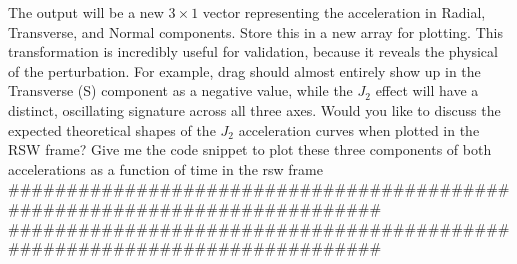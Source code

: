  The output will be a new $3 \times 1$ vector representing the acceleration in Radial, Transverse, and Normal components. Store this in a new array for plotting.\markdownRendererOlItemEnd 
\markdownRendererOlEnd \markdownRendererInterblockSeparator
{}This transformation is incredibly useful for validation, because it reveals the physical  of the perturbation. For example, drag should almost entirely show up in the Transverse (S) component as a negative value, while the $J_2$ effect will have a distinct, oscillating signature across all three axes.\markdownRendererInterblockSeparator
{}Would you like to discuss the expected theoretical shapes of the $J_2$ acceleration curves when plotted in the RSW frame?\markdownRendererInterblockSeparator
{}\markdownRendererThematicBreak{}\markdownRendererInterblockSeparator
{}
\markdownRendererSectionEnd 
\markdownRendererSectionEnd \markdownRendererSectionBegin
{}\markdownRendererInterblockSeparator
{}Give me the code snippet to plot these three components of both accelerations as a function of time in the rsw frame\markdownRendererInterblockSeparator
{}###########################################################################\markdownRendererInterblockSeparator
{}
\markdownRendererSectionEnd 
\markdownRendererSectionEnd \markdownRendererSectionBegin
{}\markdownRendererInterblockSeparator
{}###########################################################################\markdownRendererInterblockSeparator
{}
\markdownRendererSectionEnd \markdownRendererSectionBegin
{}\markdownRendererInterblockSeparator
{}
\markdownRendererSectionEnd \markdownRendererSectionBegin
{}\markdownRendererInterblockSeparator
{}
\markdownRendererSectionEnd \markdownRendererSectionBegin
{}\markdownRendererInterblockSeparator
{}
\markdownRendererSectionEnd \markdownRendererSectionBegin
{}\markdownRendererInterblockSeparator
{}
\markdownRendererSectionEnd \markdownRendererSectionBegin
{}\markdownRendererInterblockSeparator
{}
\markdownRendererSectionEnd \markdownRendererSectionBegin
